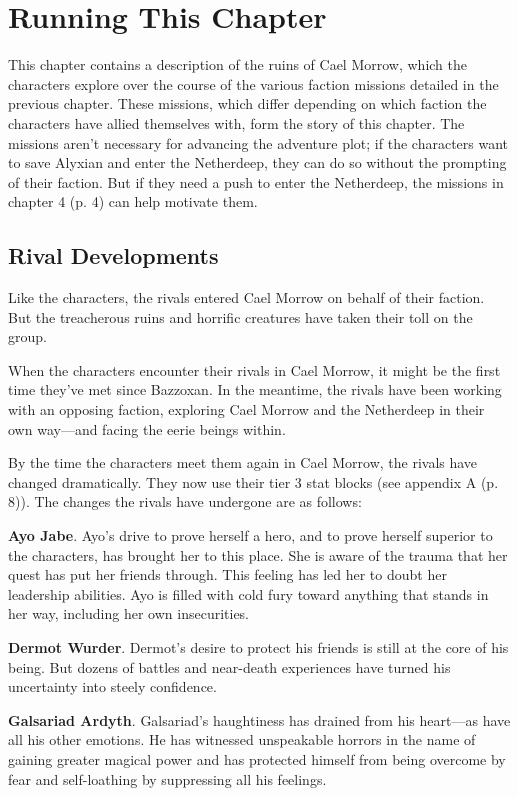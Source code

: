 \documentclass[a4paper, 11pt, bg=full, twocolumn, nooutline]{dndbook}
\begin{document}
\section{Running This Chapter}

This chapter contains a description of the ruins of Cael Morrow, which the characters explore over the course of the various faction missions detailed in the previous chapter. These missions, which differ depending on which faction the characters have allied themselves with, form the story of this chapter. The missions aren't necessary for advancing the adventure plot; if the characters want to save Alyxian and enter the Netherdeep, they can do so without the prompting of their faction. But if they need a push to enter the Netherdeep, the missions in chapter 4 (p. 4) can help motivate them.

\subsection{Rival Developments}

Like the characters, the rivals entered Cael Morrow on behalf of their faction. But the treacherous ruins and horrific creatures have taken their toll on the group.

When the characters encounter their rivals in Cael Morrow, it might be the first time they've met since Bazzoxan. In the meantime, the rivals have been working with an opposing faction, exploring Cael Morrow and the Netherdeep in their own way---and facing the eerie beings within.

By the time the characters meet them again in Cael Morrow, the rivals have changed dramatically. They now use their tier 3 stat blocks (see appendix A (p. 8)). The changes the rivals have undergone are as follows:

\textbf{Ayo Jabe}. Ayo's drive to prove herself a hero, and to prove herself superior to the characters, has brought her to this place. She is aware of the trauma that her quest has put her friends through. This feeling has led her to doubt her leadership abilities. Ayo is filled with cold fury toward anything that stands in her way, including her own insecurities.

\textbf{Dermot Wurder}. Dermot's desire to protect his friends is still at the core of his being. But dozens of battles and near-death experiences have turned his uncertainty into steely confidence.

\textbf{Galsariad Ardyth}. Galsariad's haughtiness has drained from his heart---as have all his other emotions. He has witnessed unspeakable horrors in the name of gaining greater magical power and has protected himself from being overcome by fear and self-loathing by suppressing all his feelings.
\end{document}
